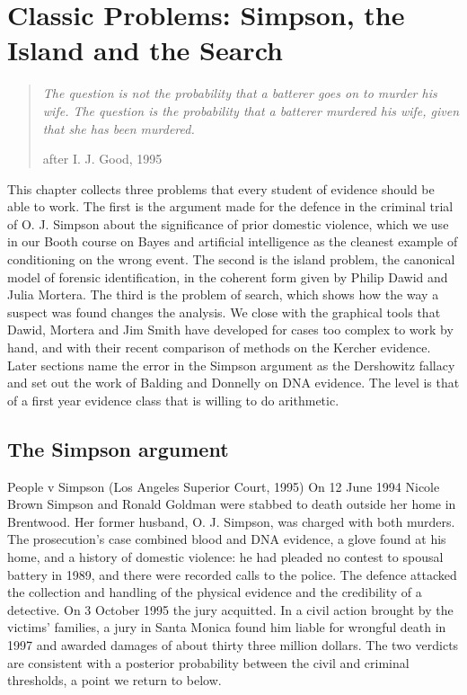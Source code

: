 \chapter{Classic Problems: Simpson, the Island and the Search}
\label{ch:classic}

\begin{quote}\itshape
The question is not the probability that a batterer goes on to murder his wife. The question is the probability that a batterer murdered his wife, given that she has been murdered.
\par\hfill\normalfont after I. J. Good, 1995
\end{quote}

This chapter collects three problems that every student of evidence should be able to work. The first is the argument made for the defence in the criminal trial of O. J. Simpson about the significance of prior domestic violence, which we use in our Booth course on Bayes and artificial intelligence as the cleanest example of conditioning on the wrong event. The second is the island problem, the canonical model of forensic identification, in the coherent form given by Philip Dawid and Julia Mortera. The third is the problem of search, which shows how the way a suspect was found changes the analysis. We close with the graphical tools that Dawid, Mortera and Jim Smith have developed for cases too complex to work by hand, and with their recent comparison of methods on the Kercher evidence. Later sections name the error in the Simpson argument as the Dershowitz fallacy and set out the work of Balding and Donnelly on DNA evidence. The level is that of a first year evidence class that is willing to do arithmetic.

\section{The Simpson argument}

\begin{casebox}{People v Simpson (Los Angeles Superior Court, 1995)}
On 12 June 1994 Nicole Brown Simpson and Ronald Goldman were stabbed to death outside her home in Brentwood. Her former husband, O. J. Simpson, was charged with both murders. The prosecution's case combined blood and DNA evidence, a glove found at his home, and a history of domestic violence: he had pleaded no contest to spousal battery in 1989, and there were recorded calls to the police. The defence attacked the collection and handling of the physical evidence and the credibility of a detective. On 3 October 1995 the jury acquitted. In a civil action brought by the victims' families, a jury in Santa Monica found him liable for wrongful death in 1997 and awarded damages of about thirty three million dollars. The two verdicts are consistent with a posterior probability between the civil and criminal thresholds, a point we return to below.
\end{casebox}

